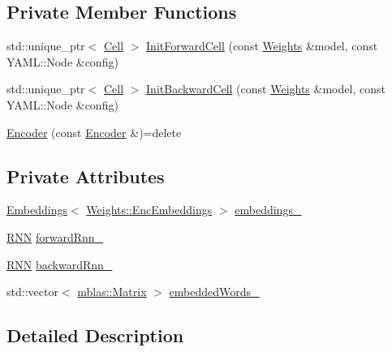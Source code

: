 \subsection*{Private Member Functions}
\begin{DoxyCompactItemize}
\item 
std\+::unique\+\_\+ptr$<$ \hyperlink{classamunmt_1_1GPU_1_1Cell}{Cell} $>$ \hyperlink{classamunmt_1_1GPU_1_1Encoder_a0ee54ff7a53a4b877c7fcdd7e2615d6b}{Init\+Forward\+Cell} (const \hyperlink{structamunmt_1_1GPU_1_1Weights}{Weights} \&model, const Y\+A\+M\+L\+::\+Node \&config)
\item 
std\+::unique\+\_\+ptr$<$ \hyperlink{classamunmt_1_1GPU_1_1Cell}{Cell} $>$ \hyperlink{classamunmt_1_1GPU_1_1Encoder_aa697a25b5da8b77d76a26db8e6c480c7}{Init\+Backward\+Cell} (const \hyperlink{structamunmt_1_1GPU_1_1Weights}{Weights} \&model, const Y\+A\+M\+L\+::\+Node \&config)
\item 
\hyperlink{classamunmt_1_1GPU_1_1Encoder_a5914793404e83167c533d4501741505c}{Encoder} (const \hyperlink{classamunmt_1_1GPU_1_1Encoder}{Encoder} \&)=delete
\end{DoxyCompactItemize}
\subsection*{Private Attributes}
\begin{DoxyCompactItemize}
\item 
\hyperlink{classamunmt_1_1GPU_1_1Encoder_1_1Embeddings}{Embeddings}$<$ \hyperlink{structamunmt_1_1GPU_1_1Weights_1_1EncEmbeddings}{Weights\+::\+Enc\+Embeddings} $>$ \hyperlink{classamunmt_1_1GPU_1_1Encoder_ab7565ccf2c9dc78964a14cf8d89e1f9b}{embeddings\+\_\+}
\item 
\hyperlink{classamunmt_1_1GPU_1_1Encoder_1_1RNN}{R\+NN} \hyperlink{classamunmt_1_1GPU_1_1Encoder_a7969e9427ccd69602c343a18f5e135ae}{forward\+Rnn\+\_\+}
\item 
\hyperlink{classamunmt_1_1GPU_1_1Encoder_1_1RNN}{R\+NN} \hyperlink{classamunmt_1_1GPU_1_1Encoder_a75b56c6fa2294c037bcb6f056f92151e}{backward\+Rnn\+\_\+}
\item 
std\+::vector$<$ \hyperlink{namespaceamunmt_1_1GPU_1_1mblas_ab67821a8254de53e45a623cf73c0aef6}{mblas\+::\+Matrix} $>$ \hyperlink{classamunmt_1_1GPU_1_1Encoder_aaa3992abb2dad6ae985fad5734354f76}{embedded\+Words\+\_\+}
\end{DoxyCompactItemize}


\subsection{Detailed Description}


